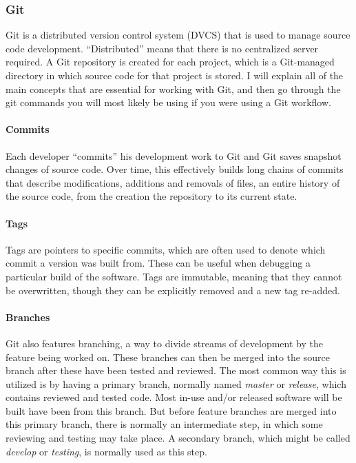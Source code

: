 \hypertarget{git}{%
\subsubsection{Git}\label{git}}

Git is a distributed version control system (DVCS) that is used to manage source code development. ``Distributed'' means that there is no centralized server required. A Git repository is created for each project, which is a Git-managed directory in which source code for that project is stored. I will explain all of the main concepts that are essential for working with Git, and then go through the git commands you will most likely be using if you were using a Git workflow.

\hypertarget{commits}{%
\paragraph{Commits}\label{commits}}

Each developer ``commits'' his development work to Git and Git saves snapshot changes of source code. Over time, this effectively builds long chains of commits that describe modifications, additions and removals of files, an entire history of the source code, from the creation the repository to its current state.

\hypertarget{tags}{%
\paragraph{Tags}\label{tags}}

Tags are pointers to specific commits, which are often used to denote which commit a version was built from. These can be useful when debugging a particular build of the software. Tags are immutable, meaning that they cannot be overwritten, though they can be explicitly removed and a new tag re-added.

\hypertarget{branches}{%
\paragraph{Branches}\label{branches}}

Git also features branching, a way to divide streams of development by the feature being worked on. These branches can then be merged into the source branch after these have been tested and reviewed. The most common way this is utilized is by having a primary branch, normally named \emph{master} or \emph{release}, which contains reviewed and tested code. Most in-use and/or released software will be built have been from this branch. But before feature branches are merged into this primary branch, there is normally an intermediate step, in which some reviewing and testing may take place. A secondary branch, which might be called \emph{develop} or \emph{testing}, is normally used as this step.


